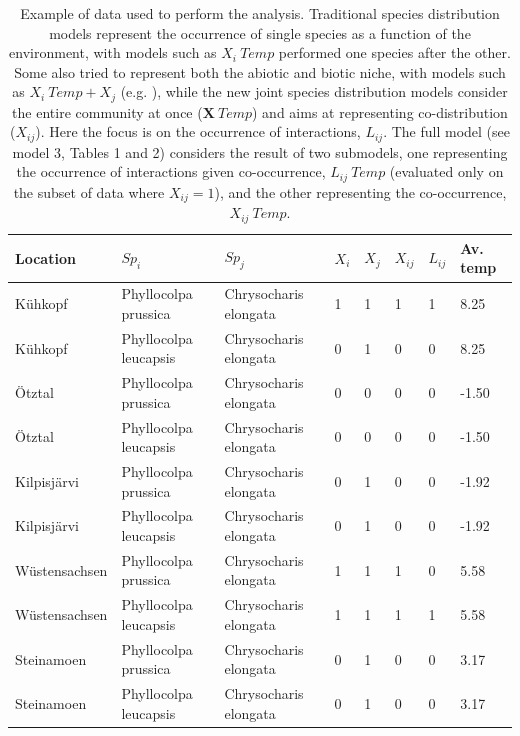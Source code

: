 \documentclass[12pt]{article}
\begin{document}
\begin{table}[]
\centering

\caption{Example of data used to perform the analysis. Traditional species distribution models represent the occurrence of single species as a function of the environment, with models such as $X_i­~Temp$ performed one species after the other. Some also tried to represent both the abiotic and biotic niche, with models such as $X_i­~Temp + X_j$ (e.g. \citealt{GonzalezSalasar2013}), while the new joint species distribution models \citep{Ovaskainen2017} consider the entire community at once ($\mathbf{X}~Temp$) and aims at representing co-distribution ($X_{ij}$). Here the focus is on the occurrence of interactions, $L_{ij}$. The full model (see model 3, Tables 1 and 2) considers the result of two submodels, one representing the occurrence of interactions given co-occurrence, $L_{ij}~Temp$ (evaluated only on the subset of data where $X_{ij}=1$), and the other representing the co-occurrence, $X_{ij}~Temp$.}

\begin{tabular}{llllllll}
\hline
Location & $Sp_i$ & $Sp_j$ & $X_i$ & $X_j$ & $X_{ij}$ & $L_{ij}$ & Av. temp \\ \hline
Kühkopf 		& Phyllocolpa prussica  & Chrysocharis elongata & 1 & 1 & 1 & 1 &  8.25 \\
Kühkopf 		& Phyllocolpa leucapsis & Chrysocharis elongata & 0 & 1 & 0 & 0 &  8.25 \\
Ötztal 			& Phyllocolpa prussica  & Chrysocharis elongata & 0 & 0 & 0 & 0 & -1.50 \\
Ötztal 			& Phyllocolpa leucapsis & Chrysocharis elongata & 0 & 0 & 0 & 0 & -1.50 \\
Kilpisjärvi		& Phyllocolpa prussica  & Chrysocharis elongata & 0 & 1 & 0 & 0 & -1.92 \\
Kilpisjärvi		& Phyllocolpa leucapsis & Chrysocharis elongata & 0 & 1 & 0 & 0 & -1.92 \\
Wüstensachsen	& Phyllocolpa prussica  & Chrysocharis elongata & 1 & 1 & 1 & 0 &  5.58 \\
Wüstensachsen	& Phyllocolpa leucapsis & Chrysocharis elongata & 1 & 1 & 1 & 1 &  5.58 \\
Steinamoen      & Phyllocolpa prussica  & Chrysocharis elongata & 0 & 1 & 0 & 0 &  3.17 \\
Steinamoen      & Phyllocolpa leucapsis & Chrysocharis elongata & 0 & 1 & 0 & 0 &  3.17 \\ 
\hline
\end{tabular}
\end{table}
\end{document}
